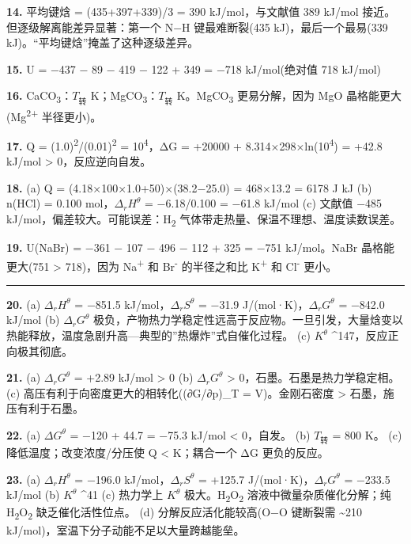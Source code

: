 \textbf{14.} 平均键焓 = (435+397+339)/3 = 390 kJ/mol，与文献值 389 kJ/mol 接近。但逐级解离能差异显著：第一个 N−H 键最难断裂(435 kJ)，最后一个最易(339 kJ)。``平均键焓''掩盖了这种逐级差异。

\textbf{15.} U = −437 − 89 − 419 − 122 + 349 = −718 kJ/mol(绝对值 718 kJ/mol)

\textbf{16.} CaCO\textsubscript{3}：\(T_{转}\)  K；MgCO\textsubscript{3}：\(T_{转}\)  K。MgCO\textsubscript{3} 更易分解，因为 MgO 晶格能更大(Mg\textsuperscript{2+} 半径更小)。

\textbf{17.} Q = (1.0)\textsuperscript{2}/(0.01)\textsuperscript{2} = 10\textsuperscript{4}，ΔG = +20000 + 8.314×298×ln(10\textsuperscript{4}) = +42.8 kJ/mol \textgreater{} 0，反应逆向自发。

\textbf{18.}
(a) Q = (4.18×100×1.0+50)×(38.2−25.0) = 468×13.2 = 6178 J  kJ
(b) n(HCl) = 0.100 mol，\(\Delta_r H^\theta\) = −6.18/0.100 = −61.8 kJ/mol
(c) 文献值 −485 kJ/mol，偏差较大。可能误差：H\textsubscript{2} 气体带走热量、保温不理想、温度读数误差。

\textbf{19.} U(NaBr) = −361 − 107 − 496 − 112 + 325 = −751 kJ/mol。NaBr 晶格能更大(751 \textgreater{} 718)，因为 Na\textsuperscript{+} 和 Br\textsuperscript{-} 的半径之和比 K\textsuperscript{+} 和 Cl\textsuperscript{-} 更小。

\begin{center}\rule{0.5\linewidth}{0.5pt}\end{center}

\textbf{20.}
(a) \(\Delta_r H^\theta\) = −851.5 kJ/mol，\(\Delta_r S^\theta\) = −31.9 J/(mol·K)，\(\Delta_r G^\theta\) = −842.0 kJ/mol
(b) \(\Delta_r G^\theta\) 极负，产物热力学稳定性远高于反应物。一旦引发，大量焓变以热能释放，温度急剧升高---典型的''热爆炸''式自催化过程。
(c) \(K^\theta\) \^{}147，反应正向极其彻底。

\textbf{21.}
(a) \(\Delta_r G^\theta\) = +2.89 kJ/mol \textgreater{} 0
(b) \(\Delta_r G^\theta\) \textgreater{} 0，石墨。石墨是热力学稳定相。
(c) 高压有利于向密度更大的相转化((∂G/∂p)\_T = V)。金刚石密度 \textgreater{} 石墨，施压有利于石墨。

\textbf{22.}
(a) \(\Delta G^\theta\) = −120 + 44.7 = −75.3 kJ/mol \textless{} 0，自发。
(b) \(T_{转}\) = 800 K。
(c) 降低温度；改变浓度/分压使 Q \textless{} K；耦合一个 ΔG 更负的反应。

\textbf{23.}
(a) \(\Delta_r H^\theta\) = −196.0 kJ/mol，\(\Delta_r S^\theta\) = +125.7 J/(mol·K)，\(\Delta_r G^\theta\) = −233.5 kJ/mol
(b) \(K^\theta\) \^{}41
(c) 热力学上 \(K^\theta\) 极大。H\textsubscript{2}O\textsubscript{2} 溶液中微量杂质催化分解；纯 H\textsubscript{2}O\textsubscript{2} 缺乏催化活性位点。
(d) 分解反应活化能较高(O−O 键断裂需 \textasciitilde210 kJ/mol)，室温下分子动能不足以大量跨越能垒。

